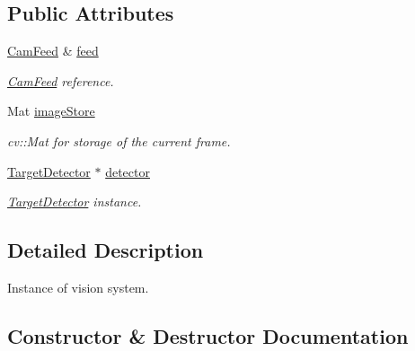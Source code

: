 \subsection*{Public Attributes}
\begin{DoxyCompactItemize}
\item 
\hypertarget{classInstanceStore_a7246f1e0ac496d9f642e93828221f064}{}\hyperlink{classCamFeed}{Cam\+Feed} \& \hyperlink{classInstanceStore_a7246f1e0ac496d9f642e93828221f064}{feed}\label{classInstanceStore_a7246f1e0ac496d9f642e93828221f064}

\begin{DoxyCompactList}\small\item\em \hyperlink{classCamFeed}{Cam\+Feed} reference. \end{DoxyCompactList}\item 
\hypertarget{classInstanceStore_acb46deba4a380a80c7a15caf5337fe8a}{}Mat \hyperlink{classInstanceStore_acb46deba4a380a80c7a15caf5337fe8a}{image\+Store}\label{classInstanceStore_acb46deba4a380a80c7a15caf5337fe8a}

\begin{DoxyCompactList}\small\item\em cv\+::\+Mat for storage of the current frame. \end{DoxyCompactList}\item 
\hypertarget{classInstanceStore_a0cc53cd71c210fbe7d0d0c2e4a7ba78f}{}\hyperlink{classTargetDetector}{Target\+Detector} $\ast$ \hyperlink{classInstanceStore_a0cc53cd71c210fbe7d0d0c2e4a7ba78f}{detector}\label{classInstanceStore_a0cc53cd71c210fbe7d0d0c2e4a7ba78f}

\begin{DoxyCompactList}\small\item\em \hyperlink{classTargetDetector}{Target\+Detector} instance. \end{DoxyCompactList}\end{DoxyCompactItemize}


\subsection{Detailed Description}
Instance of vision system. 

\subsection{Constructor \& Destructor Documentation}
\hypertarget{classInstanceStore_a7a4c15b300c608a4b5b12549bad574fe}{}
